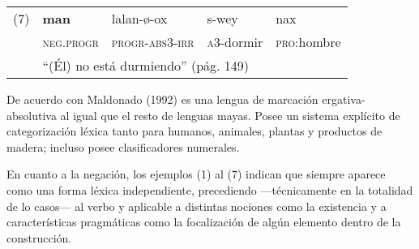 {      %
      \begin{tabular}{rllll}
            \multicolumn{1}{l}{(7)} & \textbf{man}                                            & lalan-ø-ox              & s-wey              & nax                 \\
                                    & \textsc{neg.progr}                                      & \textsc{progr-abs3-irr} & \textsc{a3}-dormir & \textsc{pro}:hombre \\
                                    & \multicolumn{4}{l}{“(Él) no está durmiendo” (pág. 149)}                                                                      \\
      \end{tabular} \vspace{0.5cm}
}

De acuerdo con Maldonado (1992) es una lengua de marcación ergativa-absolutiva al igual que el resto de lenguas mayas. Posee un sistema explícito de categorización léxica tanto para humanos, animales, plantas y productos de madera; incluso posee clasificadores numerales.

En cuanto a la negación, los ejemplos (1) al (7) indican que siempre aparece como una forma léxica independiente, precediendo —técnicamente en la totalidad de lo casos— al verbo y aplicable a distintas nociones como la existencia y a características pragmáticas como la focalización de algún elemento dentro de la construcción.
